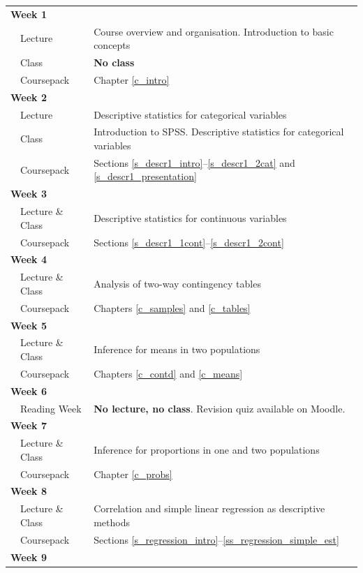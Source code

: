 \begin{tabular}{lll}
\multicolumn{2}{l}{\textbf{Week 1}} & \\
& Lecture  & Course overview and organisation. Introduction to basic
concepts\\
& Class & \textbf{No class}\\
& Coursepack & Chapter \ref{c_intro}  \\[3ex]
\multicolumn{2}{l}{\textbf{Week 2}} & \\
& Lecture & Descriptive statistics for categorical variables  \\
& Class & Introduction to SPSS. Descriptive statistics for categorical variables\\
& Coursepack &
Sections
\ref{s_descr1_intro}--\ref{s_descr1_2cat} and
\ref{s_descr1_presentation}\\[3ex]
\multicolumn{2}{l}{\textbf{Week 3}} & \\
& Lecture \& Class & Descriptive statistics for continuous variables \\
& Coursepack & Sections
\ref{s_descr1_1cont}--\ref{s_descr1_2cont}
\\[3ex]
\multicolumn{2}{l}{\textbf{Week 4}} & \\
& Lecture  \& Class & Analysis of two-way contingency tables \\
& Coursepack & Chapters \ref{c_samples} and \ref{c_tables}
\\[3ex]
\multicolumn{2}{l}{\textbf{Week 5}} & \\
& Lecture  \& Class& Inference for means in two populations \\
& Coursepack & Chapters \ref{c_contd} and \ref{c_means} \\[3ex]
\multicolumn{2}{l}{\textbf{Week 6}} & \\
&Reading Week & \textbf{No lecture, no class}. Revision quiz  available on Moodle. \\[3ex]
\multicolumn{2}{l}{\textbf{Week 7}} & \\
& Lecture  \& Class & Inference for proportions in one and two populations\\
& Coursepack & Chapter \ref{c_probs} \\[3ex]
\multicolumn{2}{l}{\textbf{Week 8}} & \\
& Lecture  \& Class & Correlation and simple linear regression as descriptive methods \\
& Coursepack & Sections \ref{s_regression_intro}--\ref{ss_regression_simple_est} \\[3ex]
\multicolumn{2}{l}{\textbf{Week 9}} & \\

\end{tabular}
